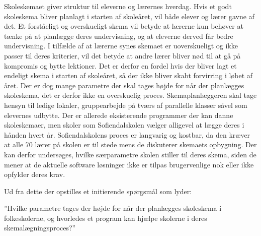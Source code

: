 Skoleskemaet giver struktur til eleverne og lærernes hverdag. Hvis et godt skoleskema bliver planlagt i starten af skoleåret, vil både elever og lærer gavne af det. Et forståeligt og overskueligt skema vil betyde at lærerne kun behøver at tænke på at planlægge deres undervisning, og at eleverne derved får bedre undervisning. I tilfælde af at lærerne synes skemaet er uoverskueligt og ikke passer til deres kriterier, vil det betyde at andre lærer bliver nød til at gå på kompromis og bytte lektioner. Det er derfor en fordel hvis der bliver lagt et endeligt skema i starten af skoleåret, så der ikke bliver skabt forvirring i løbet af året. 
Der er dog mange parametre der skal tages højde for når der planlægges skoleskema, det er derfor ikke en overskuelig proces. Skemaplanlæggeren skal tage hensyn til ledige lokaler, gruppearbejde på tværs af parallelle klasser såvel som elevernes udbytte. Der er allerede eksisterende programmer der kan danne skoleskemaer, men skoler som Sofiendalskolen vælger alligevel at lægge deres i hånden hvert år. Sofiendalskolens proces er langvarig og kostbar, da den kræver at alle 70 lærer på skolen er til stede mens de diskuterer skemaets opbygning. Der kan derfor undersøges, hvilke særparametre skolen stiller til deres skema, siden de mener at de aktuelle software løsninger ikke er tilpas brugervenlige nok eller ikke opfylder deres krav. 

Ud fra dette der opstilles et initierende spørgsmål som lyder:

”Hvilke parametre tages der højde for når der planlægges skoleskema i folkeskolerne, og hvorledes et program kan hjælpe skolerne i deres skemalægningsproces?”
